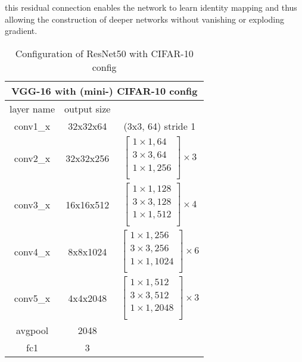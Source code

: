 \documentclass[extendedabs]{bmvc2k}
\begin{document}
this residual connection enables the network to learn identity mapping and thus allowing the construction of deeper networks without vanishing or exploding gradient.



\begin{table}[]
\centering
\begin{tabular}{|ccc|}
\hline
\multicolumn{3}{|c|}{VGG-16 with (mini-) CIFAR-10 config}                                \\ \hline
\multicolumn{1}{|c|}{layer name} & \multicolumn{1}{c|}{output size} &                    \\ \hline
\multicolumn{1}{|c|}{conv1\_x}   & \multicolumn{1}{c|}{32x32x64}    & (3x3, 64) stride 1 \\ \hline
\multicolumn{1}{|c|}{conv2\_x}   & \multicolumn{1}{c|}{32x32x256}   & $\left[\begin{array}{cc}1\times1, 64  \\3\times3, 64  \\1\times1, 256 \\\end{array}\right] \times 3$           \\ \hline
\multicolumn{1}{|c|}{conv3\_x}   & \multicolumn{1}{c|}{16x16x512}   & $\left[\begin{array}{cc}1\times1, 128  \\3\times3, 128  \\1\times1, 512 \\\end{array}\right] \times 4$            \\ \hline
\multicolumn{1}{|c|}{conv4\_x}   & \multicolumn{1}{c|}{8x8x1024}    & $\left[\begin{array}{cc}1\times1, 256  \\3\times3, 256  \\1\times1, 1024 \\\end{array}\right] \times 6$             \\ \hline
\multicolumn{1}{|c|}{conv5\_x}   & \multicolumn{1}{c|}{4x4x2048}    & $\left[\begin{array}{cc}1\times1, 512  \\3\times3, 512  \\1\times1, 2048 \\\end{array}\right] \times 3$            \\ \hline
\multicolumn{1}{|c|}{avgpool}    & \multicolumn{1}{c|}{2048}        &             \\ \hline
\multicolumn{1}{|c|}{fc1}        & \multicolumn{1}{c|}{3}           &             \\ \hline
\end{tabular}
\caption{Configuration of ResNet50 with CIFAR-10 config}
\label{tab:resnetconfig}
\end{table}
\end{document}

